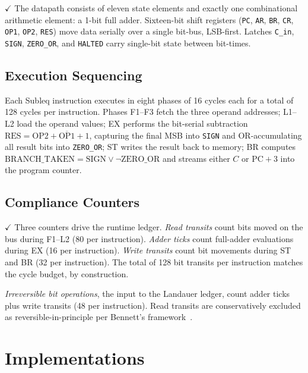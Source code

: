 \documentclass[conference,letterpaper,10pt]{IEEEtran}
\newcommand{\Verified}{\textbf{\textcolor[rgb]{0.0,0.5,0.0}{$\checkmark$}}}
\newcommand{\code}[1]{\texttt{\small #1}}
\begin{document}
\Verified{} The datapath consists of eleven state elements and
exactly one combinational arithmetic element: a 1-bit full
adder. Sixteen-bit shift registers (\code{PC}, \code{AR}, \code{BR},
\code{CR}, \code{OP1}, \code{OP2}, \code{RES}) move data
serially over a single bit-bus, LSB-first. Latches \code{C\_in},
\code{SIGN}, \code{ZERO\_OR}, and \code{HALTED} carry single-bit
state between bit-times.

\subsection{Execution Sequencing}

Each Subleq instruction executes in eight phases of 16 cycles each
for a total of 128 cycles per instruction. Phases F1--F3 fetch
the three operand addresses; L1--L2 load the operand values; EX
performs the bit-serial subtraction $\mathrm{RES} = \mathrm{OP2} +
\overline{\mathrm{OP1}} + 1$, capturing the final MSB into \code{SIGN}
and OR-accumulating all result bits into \code{ZERO\_OR}; ST writes
the result back to memory; BR computes
$\mathrm{BRANCH\_TAKEN} = \mathrm{SIGN} \lor \neg\mathrm{ZERO\_OR}$
and streams either $C$ or $\mathrm{PC}+3$ into the program counter.

\subsection{Compliance Counters}

\Verified{} Three counters drive the runtime ledger. \emph{Read
transits} count bits moved on the bus during F1--L2 (80 per
instruction). \emph{Adder ticks} count full-adder evaluations
during EX (16 per instruction). \emph{Write transits} count bit
movements during ST and BR (32 per instruction). The total of
128 bit transits per instruction matches the cycle budget, by
construction.

\emph{Irreversible bit operations}, the input to the Landauer
ledger, count adder ticks plus write transits (48 per instruction).
Read transits are conservatively excluded as reversible-in-principle
per Bennett's framework~\cite{bennett1973}.

\section{Implementations}
\end{document}
